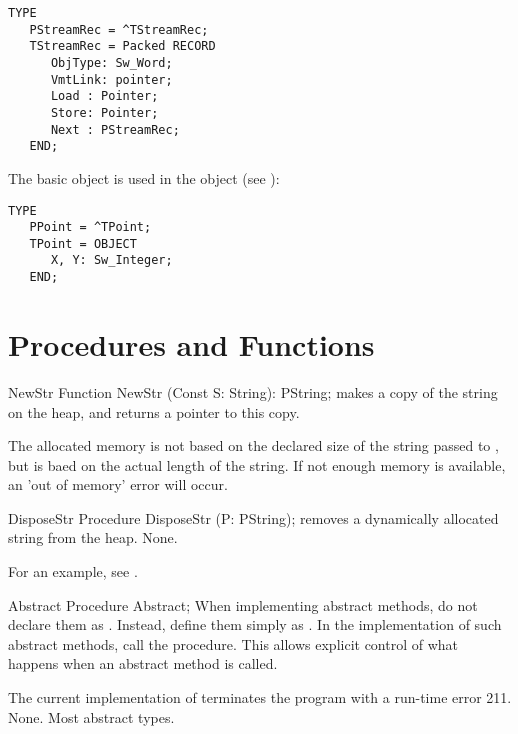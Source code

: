 \begin{verbatim}
TYPE
   PStreamRec = ^TStreamRec;
   TStreamRec = Packed RECORD
      ObjType: Sw_Word;
      VmtLink: pointer;
      Load : Pointer;
      Store: Pointer;
      Next : PStreamRec;
   END;
\end{verbatim}

The  basic object is used in the  object (see
):
\begin{verbatim}
TYPE
   PPoint = ^TPoint;
   TPoint = OBJECT
      X, Y: Sw_Integer;
   END;
\end{verbatim}

\section{Procedures and Functions}

\begin{function}{NewStr}
\Declaration
Function NewStr (Const S: String): PString;
\Description
{} makes a copy of the string  on the heap,
and returns a pointer to this copy.

The allocated memory is not based on the declared size of the string passed
to , but is baed on the actual length of the string.
\Errors
If not enough memory is available, an 'out of memory' error will occur.
\SeeAlso
{}
\end{function}


\begin{procedure}{DisposeStr}
\Declaration
Procedure DisposeStr (P: PString);
\Description
{} removes a dynamically allocated string from the heap.
\Errors
None.
\SeeAlso
{}
\end{procedure}

For an example, see .

\begin{procedure}{Abstract}
\Declaration
Procedure Abstract;
\Description
When implementing abstract methods, do not declare them as .
Instead, define them simply as . In the implementation of such
abstract methods, call the  procedure. This allows explicit
control of what happens when an abstract method is called.

The current implementation of  terminates the program with 
a run-time error 211.
\Errors
None.
\SeeAlso Most abstract types.
\end{procedure}

